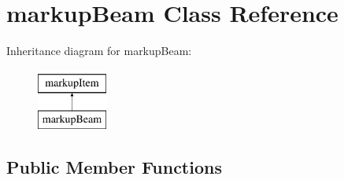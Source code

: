 \hypertarget{classmarkupBeam}{
\section{markupBeam Class Reference}
\label{classmarkupBeam}
}
Inheritance diagram for markupBeam:\begin{figure}[H]
\begin{center}
\leavevmode
\includegraphics[height=2.000000cm]{classmarkupBeam}
\end{center}
\end{figure}
\subsection*{Public Member Functions}
